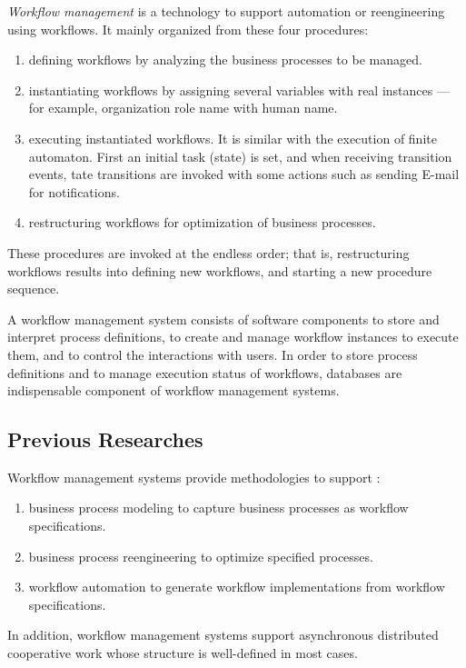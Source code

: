 \emph{Workflow management} is a technology to support automation or
reengineering using workflows.  It mainly organized from these four
procedures:
\begin{enumerate}
 \setlength{\itemsep}{0mm}
 \setlength{\parskip}{0mm}
 \item defining workflows by analyzing the business processes to be
       managed.
 \item instantiating workflows by assigning several variables with real
       instances --- for example, organization role name with human name.
 \item executing instantiated workflows.  It is similar with the
       execution of finite automaton.  First an initial task (state) is
       set, and when receiving transition events, tate transitions are
       invoked with some actions such as sending E-mail for
       notifications.
 \item restructuring workflows for optimization of business processes.
\end{enumerate}
These procedures are invoked at the endless order; that is,
restructuring workflows results into defining new workflows, and
starting a new procedure sequence.

A workflow management system consists of software components to store
and interpret process definitions, to create and manage workflow instances
to execute them, and to control the interactions with users.  In order to
store process definitions and to manage execution status of workflows,
databases are indispensable component of workflow management systems.

%
%

\subsection{Previous Researches}

\begin{sloppypar}
 Workflow management systems provide methodologies to support
 \cite{georgakopoulos:jdps95}:
\end{sloppypar}
\begin{enumerate}
 \setlength{\itemsep}{0mm}
 \setlength{\parskip}{0mm}
 \item business process modeling to capture business processes as
       workflow specifications.
 \item business process reengineering to optimize specified processes.
 \item workflow automation to generate workflow implementations from
       workflow specifications.
\end{enumerate}
In addition, workflow management systems support asynchronous
distributed cooperative work whose structure is well-defined in most
cases.

